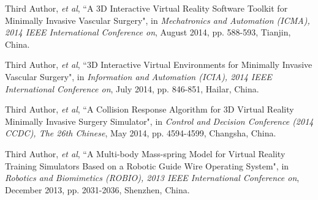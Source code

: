 \begin{publications}{99}
\item Third Author, \textit{et al}, ``A 3D Interactive Virtual Reality Software Toolkit for Minimally Invasive Vascular Surgery", in \textit{Mechatronics and Automation (ICMA), 2014 IEEE International Conference on}, August 2014, pp. 588-593, Tianjin, China.%

\item Third Author, \textit{et al}, ``3D Interactive Virtual Environments for Minimally Invasive Vascular Surgery", in \textit{Information and Automation (ICIA), 2014 IEEE International Conference on}, July 2014, pp. 846-851, Hailar, China.%

\item Third Author, \textit{et al}, ``A Collision Response Algorithm for 3D Virtual Reality Minimally Invasive Surgery Simulator", in \textit{Control and Decision Conference (2014 CCDC), The 26th Chinese}, May 2014, pp. 4594-4599, Changsha, China.%

\item Third Author, \textit{et al}, ``A Multi-body Mass-spring Model for Virtual Reality Training Simulators Based on a Robotic Guide Wire Operating System", in \textit{Robotics and Biomimetics (ROBIO), 2013 IEEE International Conference on}, December 2013, pp. 2031-2036, Shenzhen, China.%

\end{publications}
